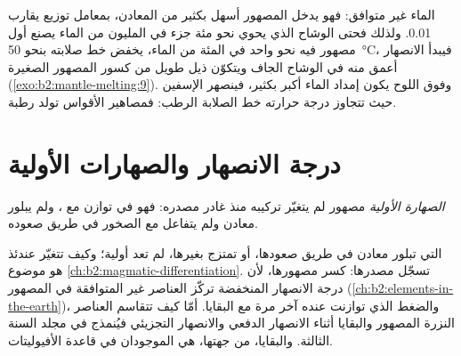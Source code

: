الماء غير متوافق: فهو يدخل المصهور أسهل بكثير من المعادن،
بمعامل توزيع يقارب 0.01. ولذلك فحتى الوشاح الذي يحوي نحو مئة
جزء في المليون من الماء يصنع أول مصهور فيه نحو واحد في المئة من
الماء، يخفض خط صلابته بنحو \qty{50}{\celsius}، فيبدأ الانصهار
أعمق منه في الوشاح الجاف ويتكوّن ذيل طويل من كسور المصهور الصغيرة
(\cref{exo:b2:mantle-melting:9}). وفوق اللوح يكون إمداد الماء أكبر بكثير، فينصهر الإسفين
حيث تتجاوز درجة حرارته خط الصلابة الرطب: فمصاهير الأقواس تولد
رطبة.

\section{درجة الانصهار والصهارات الأولية}\label{sec:b2:mantle-melting:primary}

\begin{definition}\label{def:b2:mantle-melting:primary}
\emph{الصهارة الأولية} مصهور لم يتغيّر تركيبه
منذ غادر مصدره: فهو في توازن مع ،
ولم يبلور معادن ولم يتفاعل مع الصخور في طريق صعوده.
\end{definition}

 التي تبلور معادن في طريق صعودها، أو تمتزج بغيرها، لم تعد
أولية؛ وكيف تتغيّر عندئذ هو موضوع
\cref{ch:b2:magmatic-differentiation}.  تسجّل مصدرها: كسر
مصهورها، لأن درجة الانصهار المنخفضة تركّز العناصر غير المتوافقة
في المصهور (\cref{ch:b2:elements-in-the-earth})، والضغط الذي
توازنت عنده آخر مرة مع البقايا. أمّا كيف تتقاسم العناصر النزرة المصهور
والبقايا أثناء الانصهار الدفعي والانصهار التجزيئي فيُنمذج في مجلد السنة الثالثة.
والبقايا، من جهتها، هي   الموجودان في قاعدة
الأفيوليتات.

